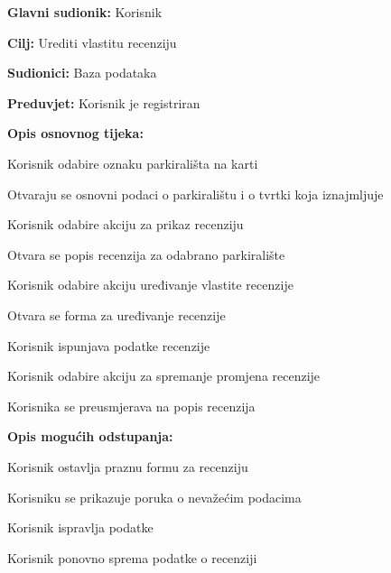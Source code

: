 \noindent {}
\begin{packed_item}
	
	\item \textbf{Glavni sudionik:} Korisnik
	\item  \textbf{Cilj:} Urediti vlastitu recenziju
	\item  \textbf{Sudionici:} Baza podataka
	\item  \textbf{Preduvjet:} Korisnik je registriran
	\item  \textbf{Opis osnovnog tijeka:}
	
	\item[] \begin{packed_enum}
		
		\item Korisnik odabire oznaku parkirališta na karti
		\item Otvaraju se osnovni podaci o parkiralištu i o tvrtki koja iznajmljuje
		\item Korisnik odabire akciju za prikaz recenziju
		\item Otvara se popis recenzija za odabrano parkiralište
		\item Korisnik odabire akciju uređivanje vlastite recenzije
		\item Otvara se forma za uređivanje recenzije
		\item Korisnik ispunjava podatke recenzije
		\item Korisnik odabire akciju za spremanje promjena recenzije
		\item Korisnika se preusmjerava na popis recenzija
		
	\item  \textbf{Opis mogućih odstupanja:}
	
	\item[] \begin{packed_item}
		
		\item[7.a] Korisnik ostavlja praznu formu za recenziju
		\item[] \begin{packed_enum}
			
			\item Korisniku se prikazuje poruka o nevažećim podacima
			\item Korisnik ispravlja podatke
			\item Korisnik ponovno sprema podatke o recenziji
			
		\end{packed_enum}
		\end{packed_item}
		
	\end{packed_enum}
\end{packed_item}


